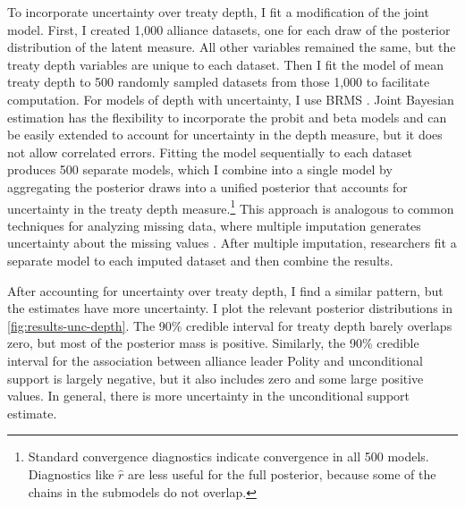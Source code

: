 \documentclass[12pt]{article}
\begin{document}
To incorporate uncertainty over treaty depth, I fit a modification of the joint model. 
First, I created 1,000 alliance datasets, one for each draw of the posterior distribution of the latent measure.
All other variables remained the same, but the treaty depth variables are unique to each dataset. 
Then I fit the model of mean treaty depth to 500 randomly sampled datasets from those 1,000 to facilitate computation. 
For models of depth with uncertainty, I use BRMS \citep{Buerkner2017}. 
Joint Bayesian estimation has the flexibility to incorporate the probit and beta models and can be easily extended to account for uncertainty in the depth measure, but it does not allow correlated errors. 
Fitting the model sequentially to each dataset produces 500 separate models, which I combine into a single model by aggregating the posterior draws into a unified posterior that accounts for uncertainty in the treaty depth measure.\footnote{Standard convergence diagnostics indicate convergence in all 500 models. Diagnostics like $\hat{r}$ are less useful for the full posterior, because some of the chains in the submodels do not overlap.}
This approach is analogous to common techniques for analyzing missing data, where multiple imputation generates uncertainty about the missing values \citep{Hollenbachetal2018imp}.
After multiple imputation, researchers fit a separate model to each imputed dataset and then combine the results. 


After accounting for uncertainty over treaty depth, I find a similar pattern, but the estimates have more uncertainty. 
I plot the relevant posterior distributions in \autoref{fig:results-unc-depth}. 
The 90\% credible interval for treaty depth barely overlaps zero, but most of the posterior mass is positive. 
Similarly, the 90\% credible interval for the association between alliance leader Polity and unconditional support is largely negative, but it also includes zero and some large positive values. 
In general, there is more uncertainty in the unconditional support estimate. 
\end{document}
